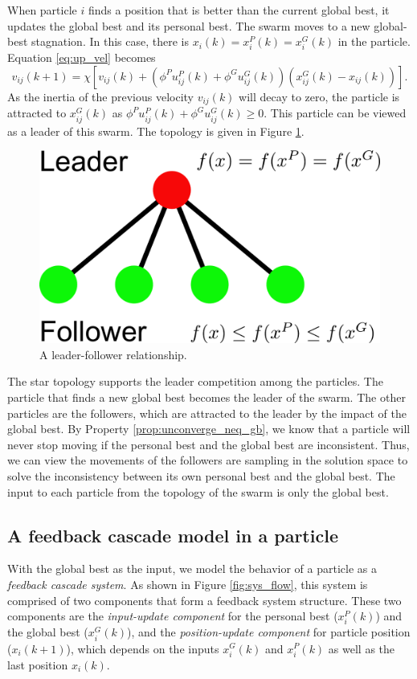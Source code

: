 When particle $ i $ finds a position that is better than the current global best, it updates the global best and its personal best.
The swarm moves to a new global-best stagnation.
In this case, there is $ x_{i}(k) = x_{i}^{P}(k) = x_{i}^{G}(k) $ in the particle.
Equation \eqref{eq:up_vel} becomes
\begin{equation}
v_{ij}(k+1) = \chi [ v_{ij}(k) 
 +( \phi^{P} u^{P}_{ij}(k) + \phi^{G} u^{G}_{ij}(k) ) (x^{G}_{ij}(k) - x_{ij}(k))  ].
\end{equation}
As the inertia of the previous velocity $ v_{ij}(k) $ will decay to zero,
the particle is attracted to $ x^{G}_{ij}(k) $ as $ \phi^{P} u^{P}_{ij}(k) + \phi^{G} u^{G}_{ij}(k) \geq 0 $.
This particle can be viewed as a leader of this swarm.
The topology is given in Figure \ref{fig:leader_follower}.
\begin{figure}[tbph]
\centering
\includegraphics[width=0.5\linewidth]{./fig/leader_follower}
\caption{A leader-follower relationship.}
\label{fig:leader_follower}
\end{figure}

The star topology supports the leader competition among the particles.
The particle that finds a new global best becomes the leader of the swarm.
The other particles are the followers, which are attracted to the leader by the impact of the global best.
By Property \ref{prop:unconverge_neq_gb}, we know that a particle will never stop moving if the personal best and the global best are inconsistent.
Thus, we can view the movements of the followers are sampling in the solution space to solve the inconsistency between its own personal best and the global best.
The input to each particle from the topology of the swarm is only the global best.

\subsection{A feedback cascade model in a particle}

With the global best as the input, we model the behavior of a particle as a \emph{feedback cascade system}.
As shown in Figure \ref{fig:sys_flow}, this system is comprised of two components that form a feedback system structure.
These two components are 
the \emph{input-update component} for the personal best ($ x^{P}_{i}(k) $) and the global best ($ x^{G}_{i}(k) $), 
and the \emph{position-update component} for particle position ($ x_{i}(k+1) $), which depends on the inputs $ x^{G}_{i}(k) $ and $ x^{P}_{i}(k) $ as well as the last position $ x_{i}(k) $.

